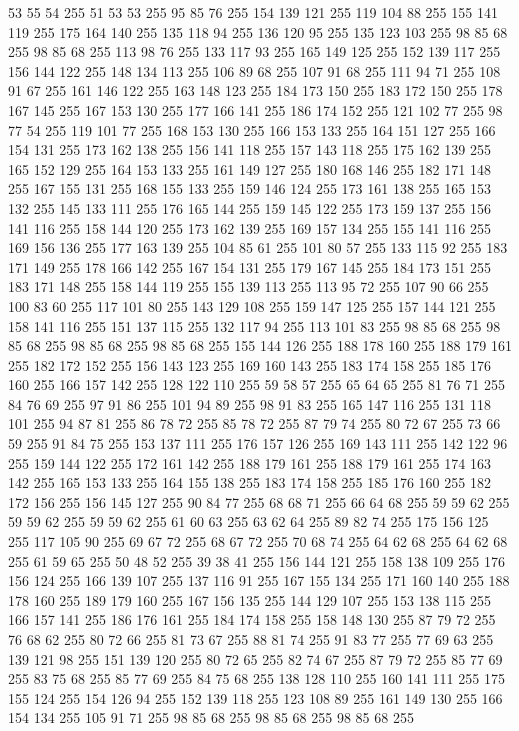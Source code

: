 53 55 54 255 51 53 53 255 95 85 76 255 154 139 121 255 119 104 88 255 155 141 119 255 175 164 140 255 135 118 94 255 136 120 95 255 135 123 103 255 98 85 68 255 98 85 68 255 113 98 76 255 133 117 93 255 165 149 125 255 152 139 117 255 156 144 122 255 148 134 113 255 106 89 68 255 107 91 68 255 111 94 71 255 108 91 67 255 161 146 122 255 163 148 123 255 184 173 150 255 183 172 150 255 178 167 145 255 167 153 130 255 177 166 141 255 186 174 152 255 121 102 77 255 98 77 54 255 119 101 77 255 168 153 130 255 166 153 133 255 164 151 127 255 166 154 131 255 173 162 138 255 156 141 118 255 157 143 118 255 175 162 139 255 165 152 129 255 164 153 133 255 161 149 127 255 180 168 146 255 182 171 148 255 167 155 131 255 168 155 133 255 159 146 124 255 173 161 138 255 165 153 132 255 145 133 111 255 176 165 144 255 159 145 122 255 173 159 137 255 156 141 116 255 158 144 120 255 173 162 139 255 169 157 134 255 155 141 116 255 169 156 136 255 177 163 139 255 104 85 61 255 101 80 57 255
133 115 92 255 183 171 149 255 178 166 142 255 167 154 131 255 179 167 145 255 184 173 151 255 183 171 148 255 158 144 119 255 155 139 113 255 113 95 72 255 107 90 66 255 100 83 60 255 117 101 80 255 143 129 108 255 159 147 125 255 157 144 121 255 158 141 116 255 151 137 115 255 132 117 94 255 113 101 83 255 98 85 68 255 98 85 68 255 98 85 68 255 98 85 68 255 155 144 126 255 188 178 160 255 188 179 161 255 182 172 152 255 156 143 123 255 169 160 143 255 183 174 158 255 185 176 160 255 166 157 142 255 128 122 110 255 59 58 57 255 65 64 65 255 81 76 71 255 84 76 69 255 97 91 86 255 101 94 89 255 98 91 83 255 165 147 116 255 131 118 101 255 94 87 81 255 86 78 72 255 85 78 72 255 87 79 74 255 80 72 67 255 73 66 59 255 91 84 75 255 153 137 111 255 176 157 126 255 169 143 111 255 142 122 96 255 159 144 122 255 172 161 142 255 188 179 161 255 188 179 161 255 174 163 142 255 165 153 133 255 164 155 138 255 183 174 158 255 185 176 160 255 182 172 156 255
156 145 127 255 90 84 77 255 68 68 71 255 66 64 68 255 59 59 62 255 59 59 62 255 59 59 62 255 61 60 63 255 63 62 64 255 89 82 74 255 175 156 125 255 117 105 90 255 69 67 72 255 68 67 72 255 70 68 74 255 64 62 68 255 64 62 68 255 61 59 65 255 50 48 52 255 39 38 41 255 156 144 121 255 158 138 109 255 176 156 124 255 166 139 107 255 137 116 91 255 167 155 134 255 171 160 140 255 188 178 160 255 189 179 160 255 167 156 135 255 144 129 107 255 153 138 115 255 166 157 141 255 186 176 161 255 184 174 158 255 158 148 130 255 87 79 72 255 76 68 62 255 80 72 66 255 81 73 67 255 88 81 74 255 91 83 77 255 77 69 63 255 139 121 98 255 151 139 120 255 80 72 65 255 82 74 67 255 87 79 72 255 85 77 69 255 83 75 68 255 85 77 69 255 84 75 68 255 138 128 110 255 160 141 111 255 175 155 124 255 154 126 94 255 152 139 118 255 123 108 89 255 161 149 130 255 166 154 134 255 105 91 71 255 98 85 68 255 98 85 68 255 98 85 68 255
